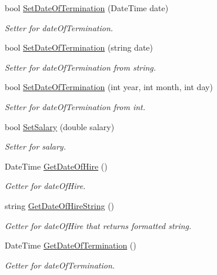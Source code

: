 \begin{DoxyCompactItemize}
bool \hyperlink{class_all_employees_1_1_fulltime_employee_a94e9d4b67b20ecbe1449701a200b1c07}{Set\+Date\+Of\+Termination} (Date\+Time date)
\begin{DoxyCompactList}\small\item\em Setter for date\+Of\+Termination. \end{DoxyCompactList}\item 
bool \hyperlink{class_all_employees_1_1_fulltime_employee_a7d142370fe7f81bd623de155a80d0214}{Set\+Date\+Of\+Termination} (string date)
\begin{DoxyCompactList}\small\item\em Setter for date\+Of\+Termination from string. \end{DoxyCompactList}\item 
bool \hyperlink{class_all_employees_1_1_fulltime_employee_aed4ff527256f96b542d0ac0c17f3e2ea}{Set\+Date\+Of\+Termination} (int year, int month, int day)
\begin{DoxyCompactList}\small\item\em Setter for date\+Of\+Termination from int. \end{DoxyCompactList}\item 
bool \hyperlink{class_all_employees_1_1_fulltime_employee_a7749239bf39282a2b803550718cae1c6}{Set\+Salary} (double salary)
\begin{DoxyCompactList}\small\item\em Setter for salary. \end{DoxyCompactList}\item 
Date\+Time \hyperlink{class_all_employees_1_1_fulltime_employee_a3a975ad60176797d1d5529e257596565}{Get\+Date\+Of\+Hire} ()
\begin{DoxyCompactList}\small\item\em Getter for date\+Of\+Hire. \end{DoxyCompactList}\item 
string \hyperlink{class_all_employees_1_1_fulltime_employee_a91b4f15454d92eb7cd33968573050ef0}{Get\+Date\+Of\+Hire\+String} ()
\begin{DoxyCompactList}\small\item\em Getter for date\+Of\+Hire that returns formatted string. \end{DoxyCompactList}\item 
Date\+Time \hyperlink{class_all_employees_1_1_fulltime_employee_a97af3da9151f97e91543d60b6b67a4fa}{Get\+Date\+Of\+Termination} ()
\begin{DoxyCompactList}\small\item\em Getter for date\+Of\+Termination. \end{DoxyCompactList}\item 

\end{DoxyCompactItemize}
